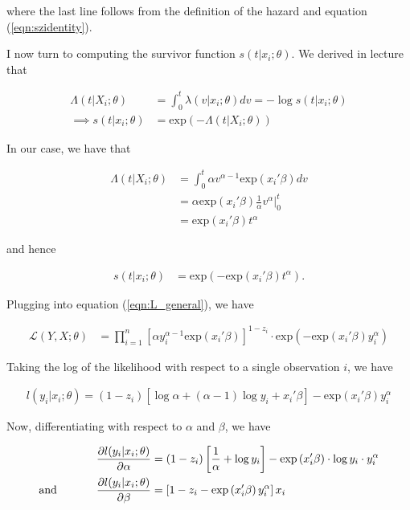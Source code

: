 \documentclass[]{report}
\newcommand{\0}{\bv{0}}
\newcommand{\1}{\bv{1}}
\newcommand{\parens}[1]{\left(#1\right)}
\newcommand{\prodonen}[2]{\prod_{#1=1}^n #2}
\renewcommand{\exp}[1]{\mathrm{exp}\parens{#1}}
\newcommand{\oneover}[1]{\frac{1}{#1}}
\begin{document}
\begin{enumerate}[1.]
\begin{enumerate}
where the last line follows from the definition of the hazard and equation (\ref{eqn:szidentity}).

I now turn to computing the survivor function $s(t|x_i;\theta)$. We derived in lecture that 

\begin{align}
\Lambda(t|X_i; \theta) &= \int_{0}^{t} \lambda(v | x_i; \theta) dv = - \log s(t| x_i; \theta)\\
\implies s(t|x_i; \theta) &= \exp{-\Lambda(t|X_i; \theta)}
\end{align}

In our case, we have that 

\begin{align}
	\Lambda(t|X_i; \theta) &= \int_{0}^{t} \alpha v^{\alpha -1} \exp{x_i' \beta} dv\\
	&= \alpha \exp{x_i' \beta} \frac{1}{\alpha} v^\alpha |^t_0\\
	&= \exp{x_i' \beta} t^\alpha
\end{align}

and hence 

\begin{align}
	s(t|x_i; \theta) &= \exp{-\exp{x_i' \beta} t^\alpha}.
\end{align}

Plugging into equation (\ref{eqn:L_general}), we have 

\begin{align}
\mathcal{L}(Y,X;\theta) &= \prodonen{i}{ \left[  \alpha y_i^{\alpha-1} \exp{x_i' \beta}  \right]^{1 - z_i} \cdot \exp{-\exp{x_i' \beta} y_i^\alpha} }
\end{align}

Taking the log of the likelihood with respect to a single observation $i$, we have

\begin{align}
	l(y_i | x_i ; \theta) = (1 -z_i) \left[ \log \alpha + (\alpha - 1) \log y_i + x_i' \beta  \right] - \exp{x_i' \beta} y_i^\alpha
\end{align}

Now, differentiating with respect to $\alpha$ and $\beta$, we have

\begin{align}
\frac{\partial l(y_i | x_i ; \theta)}{\partial \alpha} &= (1 - z_i) \left[ \oneover{\alpha} + \log y_i \right] - \exp{x_i' \beta} \cdot \log{y_i} \cdot y_i^\alpha\\
\text{and \hspace{1cm} }  \frac{\partial l(y_i | x_i ; \theta)}{\partial \beta} &= \left[ 1 - z_i - \exp{x_i' \beta} y_i^\alpha \right] x_i
\end{align}


\end{enumerate}
\end{enumerate}
\end{document}
